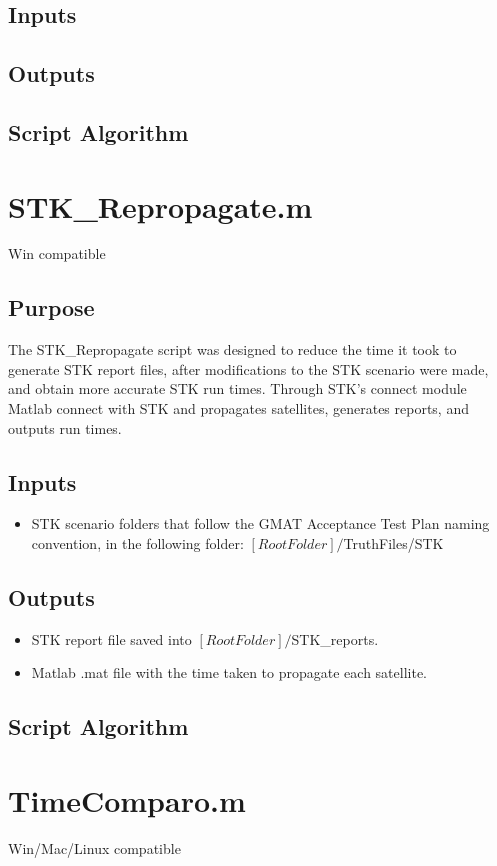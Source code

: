 \subsection{Inputs}
\subsection{Outputs}
\subsection{Script Algorithm}

\section{STK\_Repropagate.m}
Win compatible
\subsection{Purpose}
The STK\_Repropagate script was designed to reduce the time it took
to generate STK report files, after modifications to the STK
scenario were made, and obtain more accurate STK run times. Through
STK's connect module Matlab connect with STK and propagates
satellites, generates reports, and outputs run times.
\subsection{Inputs}
\begin{itemize}
    \item STK scenario folders that follow the GMAT Acceptance Test Plan
    naming convention, in the following folder:
    $[Root Folder]/$TruthFiles/STK
\end{itemize}
\subsection{Outputs}
\begin{itemize}
    \item STK report file saved into $[Root Folder]/$STK\_reports.
    \item Matlab .mat file with the time taken to propagate each satellite.
\end{itemize}
\subsection{Script Algorithm}

\section{TimeComparo.m}
Win/Mac/Linux compatible
